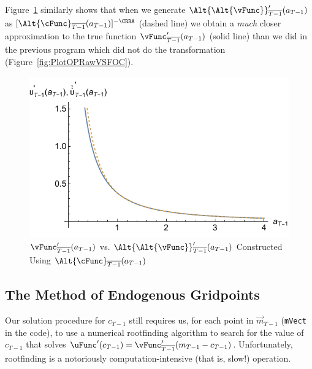\documentclass[titlepage, headings=optiontotocandhead]{\econtex}
\begin{document}
Figure~\ref{fig:GothVVSGothCInv} similarly shows that when we generate
$\Alt{\Alt{\vFunc}}_{\overline{T-1}}^{\prime}({a}_{T-1})$ as
$[\Alt{\cFunc}_{\overline{T-1}}({a}_{T-1})]^{-\CRRA}$ (dashed line) we
obtain a \textit{much} closer approximation to the true function
$\vFunc^{\prime}_{\overline{T-1}}({a}_{T-1})$ (solid line) than we did in
the previous program which did not do the
transformation (Figure~\ref{fig:PlotOPRawVSFOC}).

\hypertarget{GothVVSGothCInv}{}
\begin{figure}
  \includegraphics{./Figures/GothVVSGothCInv}
  \caption{$\vFunc^{\prime}_{\overline{T-1}}({a}_{T-1})$ vs. $\Alt{\Alt{\vFunc}}_{\overline{T-1}}^{\prime}({a}_{T-1})$ Constructed Using $\Alt{\cFunc}_{\overline{T-1}}({a}_{T-1})$}
  \label{fig:GothVVSGothCInv}
\end{figure}



\hypertarget{The-Method-of-Endogenous-Gridpoints}{}
\subsection{The Method of Endogenous Gridpoints}

Our solution procedure for ${c}_{T-1}$ still requires us, for each
point in $\vec{m}_{T-1}$ (\texttt{mVect} in the code), to use a
numerical rootfinding algorithm to search for the value of ${c}_{T-1}$
that solves $\uFunc^{\prime}({c}_{T-1}) =
\vFunc^{\prime}_{\overline{T-1}}({m}_{T-1}-{c}_{T-1})$.  Unfortunately, rootfinding
is a notoriously computation-intensive (that is, slow!) operation.
\end{document}
